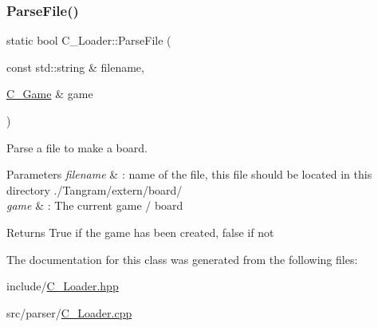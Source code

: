 \subsubsection{\texorpdfstring{Parse\+File()}{ParseFile()}\hspace{0.1cm}{\footnotesize\ttfamily [2/2]}}
{\footnotesize\ttfamily static bool C\+\_\+\+Loader\+::\+Parse\+File (\begin{DoxyParamCaption}\item[{const std\+::string \&}]{filename,  }\item[{\hyperlink{classC__Game}{C\+\_\+\+Game} \&}]{game }\end{DoxyParamCaption})\hspace{0.3cm}{\ttfamily [static]}}



Parse a file to make a board. 


\begin{DoxyParams}{Parameters}
{\em filename} & \+: name of the file, this file should be located in this directory ./\+Tangram/extern/board/ \\
\hline
{\em game} & \+: The current game / board \\
\hline
\end{DoxyParams}
\begin{DoxyReturn}{Returns}
True if the game has been created, false if not 
\end{DoxyReturn}


The documentation for this class was generated from the following files\+:\begin{DoxyCompactItemize}
\item 
include/\hyperlink{C__Loader_8hpp}{C\+\_\+\+Loader.\+hpp}\item 
src/parser/\hyperlink{C__Loader_8cpp}{C\+\_\+\+Loader.\+cpp}\end{DoxyCompactItemize}
